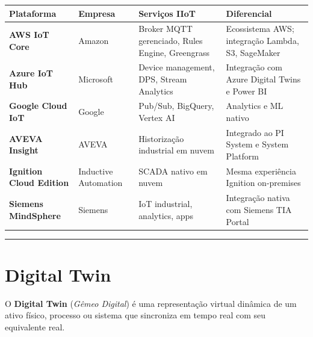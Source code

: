 \begin{longtable}[]{@{}
  >{\raggedright\arraybackslash}p{}
  >{\raggedright\arraybackslash}p{}
  >{\raggedright\arraybackslash}p{}
  >{\raggedright\arraybackslash}p{}@{}}
\toprule\noalign{}
\begin{minipage}[b]{\linewidth}\raggedright
Plataforma
\end{minipage} & \begin{minipage}[b]{\linewidth}\raggedright
Empresa
\end{minipage} & \begin{minipage}[b]{\linewidth}\raggedright
Serviços IIoT
\end{minipage} & \begin{minipage}[b]{\linewidth}\raggedright
Diferencial
\end{minipage} \\
\midrule\noalign{}
\endhead
\bottomrule\noalign{}
\endlastfoot
\textbf{AWS IoT Core} & Amazon & Broker MQTT gerenciado, Rules Engine, Greengrass & Ecossistema AWS; integração Lambda, S3, SageMaker \\
\textbf{Azure IoT Hub} & Microsoft & Device management, DPS, Stream Analytics & Integração com Azure Digital Twins e Power BI \\
\textbf{Google Cloud IoT} & Google & Pub/Sub, BigQuery, Vertex AI & Analytics e ML nativo \\
\textbf{AVEVA Insight} & AVEVA & Historização industrial em nuvem & Integrado ao PI System e System Platform \\
\textbf{Ignition Cloud Edition} & Inductive Automation & SCADA nativo em nuvem & Mesma experiência Ignition on-premises \\
\textbf{Siemens MindSphere} & Siemens & IoT industrial, analytics, apps & Integração nativa com Siemens TIA Portal \\
\end{longtable}

\begin{center}\rule{0.5\linewidth}{0.5pt}\end{center}

\section{Digital Twin}\label{digital-twin}

O \textbf{Digital Twin} (\emph{Gêmeo Digital}) é uma representação virtual dinâmica de um ativo físico, processo ou sistema que sincroniza em tempo real com seu equivalente real.

